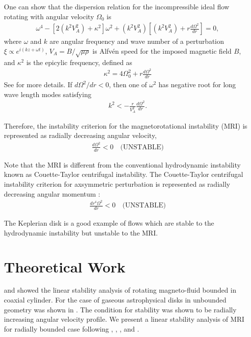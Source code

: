 \documentclass{jfm}
\begin{document}
One can show that the dispersion relation for the incompressible ideal flow 
rotating with angular velocity $\Omega_0$ is
\begin{align}
    \omega^4-\left[2\left(k^2 V_A^2\right) +\kappa^2\right]\omega^2 +\left(k^2 V_A^2\right)\left[\left(k^2 V_A^2\right)+r\frac{d \Omega^2}{dr}\right]=0,
\end{align}
where $\omega$ and $k$ are angular frequency and wave number of a perturbation
$\xi \propto e^{i(k z+\omega t)}$, $V_A = B / \sqrt{\mu \rho}$ is Alfv\'en speed
for the imposed magnetic field $B$, and $\kappa^2$ is the epicylic frequency, 
defined as
\begin{align}
    \kappa^2=4\Omega_0^2 + r \frac{d \Omega^2}{dr}
\end{align}
See \cite{Balbus1991,Balbus1998,Balbus2003} for more details. If 
$d \Omega^2 / dr < 0$, then one of $\omega^2$ has negative root for long wave 
length modes satisfying
\begin{align}
    k^2 < -\frac{r}{V_A^2}\frac{d\Omega^2}{dr}.
\end{align}

Therefore, the instability criterion for the magnetorotational instability (MRI)
is represented as radially decreasing angular velocity,
\begin{align}
    \frac{d \Omega^2}{dr}<0 \quad \text{(UNSTABLE)}
\end{align} 

Note that the MRI is different from the conventional hydrodynamic instability 
known as Couette-Taylor centrifugal instability. The Couette-Taylor centrifugal
instability criterion for axsymmetric perturbation is represented as radially 
decreasing angular momentum \cite[see][]{Charru2011}:
\begin{align}
    \frac{d r^4 \Omega^2}{dr} <0 \quad \text{(UNSTABLE)}
\end{align}

The Keplerian disk is a good example of flows which are stable to the 
hydrodynamic instability but unstable to the MRI.



\section{Theoretical Work}
\label{sec:theory}

\cite{Acheson1973} and \cite{Knobloch1992} showed the linear stability analysis
of rotating magneto-fluid bounded in coaxial cylinder. For the case of gaseous 
astrophysical disks in unbounded geometry was shown in \cite{Balbus1991}. The 
condition for stability was shown to be radially increasing angular velocity 
profile. We present a linear stability analysis of MRI for radially bounded case 
following \cite{Acheson1972}, \cite{Acheson1973a}, \cite{Knobloch1992}, and 
\cite{Julien2010}.
\end{document}
